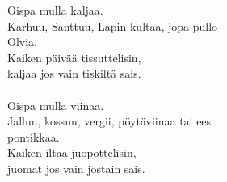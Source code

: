 
Oispa mulla kaljaa. \\ Karhuu, Santtuu, Lapin kultaa, jopa pullo- \\ Olvia. \\ Kaiken päivää tissuttelisin, \\ kaljaa jos vain tiskiltä sais. \\ \hspace{10mm} \\ Oispa mulla viinaa. \\ Jalluu, kossuu, vergii, pöytäviinaa tai ees \\ pontikkaa. \\ Kaiken iltaa juopottelisin, \\ juomat jos vain jostain sais.